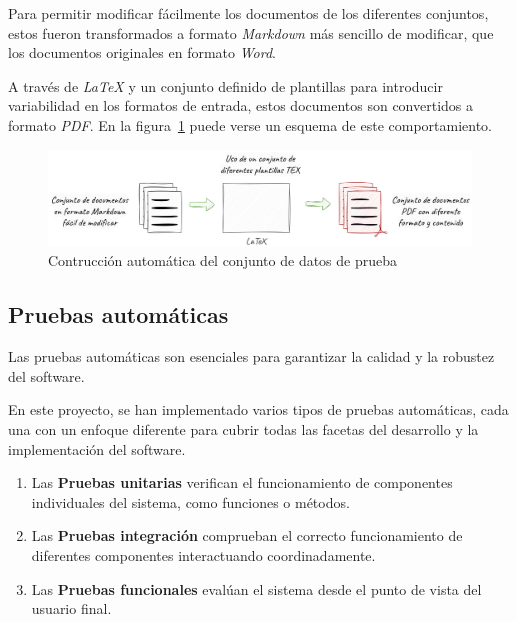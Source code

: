 Para permitir modificar fácilmente los documentos de los diferentes conjuntos, estos fueron transformados a formato
\textit{Markdown} más sencillo de modificar, que los documentos originales en formato \textit{Word}.

A través de \textit{LaTeX} y un conjunto definido de plantillas para introducir variabilidad en los formatos de
entrada, estos documentos son convertidos a formato \textit{PDF}.
En la figura~\ref{fig:chapter_4.5.dataset_construction_overview} puede verse un esquema de este comportamiento.

\begin{figure}[ht]
    \begin{center}
        \includegraphics[width=\textwidth]{./chapter/4/images/chapter_4.5.dataset_construction_overview}
        \caption{Contrucción automática del conjunto de datos de prueba}
        \label{fig:chapter_4.5.dataset_construction_overview}
    \end{center}
\end{figure}

\subsection{Pruebas automáticas}

Las pruebas automáticas son esenciales para garantizar la calidad y la robustez del software.

En este proyecto, se han implementado varios tipos de pruebas automáticas, cada una con un enfoque diferente para cubrir
todas las facetas del desarrollo y la implementación del software.

\begin{enumerate}
    \item Las \textbf{Pruebas unitarias} verifican el funcionamiento de componentes individuales del sistema, como
    funciones o métodos.
    \item Las \textbf{Pruebas integración} comprueban el correcto funcionamiento de diferentes componentes
    interactuando coordinadamente.
    \item Las \textbf{Pruebas funcionales} evalúan el sistema desde el punto de vista del usuario final.
\end{enumerate}

